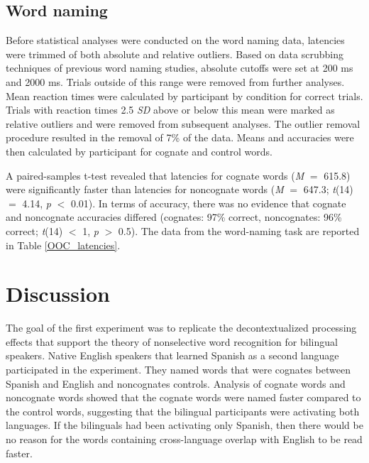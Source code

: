 \subsection{Word naming}
Before statistical analyses were conducted on the word naming data, latencies were trimmed of both absolute and relative outliers. Based on data scrubbing techniques of previous word naming studies, absolute cutoffs were set at 200 ms and 2000 ms. Trials outside of this range were removed from further analyses. Mean reaction times were calculated by participant by condition for correct trials. Trials with reaction times 2.5 \textit{SD} above or below this mean were marked as relative outliers and were removed from subsequent analyses. The outlier removal procedure resulted in the removal of 7\% of the data. Means and accuracies were then calculated by participant for cognate and control words. 

A paired-samples t-test revealed that latencies for cognate words (\textit{M} $=$ 615.8) were significantly faster than latencies for noncognate words (\textit{M} $=$ 647.3; \textit{t}(14) $=$ 4.14, \textit{p} $<$ 0.01). In terms of accuracy, there was no evidence that cognate and noncognate accuracies differed (cognates: 97\% correct, noncognates: 96\% correct; \textit{t}(14) $<$ 1, \textit{p} $>$ 0.5). The data from the word-naming task are reported in Table \ref{OOC_latencies}.



\section{Discussion}
The goal of the first experiment was to replicate the decontextualized processing effects that support the theory of nonselective word recognition for bilingual speakers. Native English speakers that learned Spanish as a second language  participated in the experiment. They named words that were cognates between Spanish and English and noncognates controls. Analysis of cognate words and noncognate words showed that the cognate words were named faster compared to the control words, suggesting that the bilingual participants were activating both languages.  If the bilinguals had been activating only Spanish, then there would be no reason for the words containing cross-language overlap with English to be read faster. 


